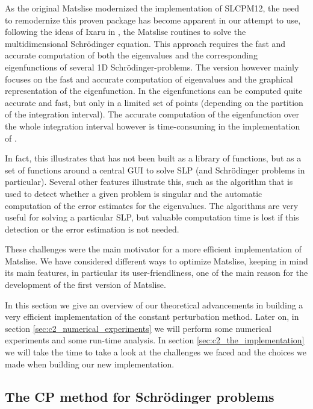 As the original Matslise modernized the implementation of SLCPM12, the need to remodernize this proven package has become apparent in our attempt to use, following the ideas of Ixaru in \cite{ixaru_new_2010}, the Matslise routines to solve the multidimensional Schrödinger equation. This approach requires the fast and accurate computation of both the eigenvalues and the corresponding eigenfunctions of several 1D Schrödinger-problems. The  version however mainly focuses on the fast and accurate computation of eigenvalues and the graphical representation of the eigenfunction. In  the eigenfunctions can be computed quite accurate and fast, but only in a limited set of points (depending on the partition of the integration interval). The accurate computation of the eigenfunction over the whole integration interval however is time-consuming in the implementation of .

In fact, this illustrates that  has not been built as a library of functions, but as a set of functions around a central GUI to solve SLP (and Schrödinger problems in particular). Several other features illustrate this, such as the algorithm that is used to detect whether a given problem is singular and the automatic computation of the error estimates for the eigenvalues. The algorithms are very useful for solving a particular SLP, but valuable computation time is lost if this detection or the error estimation is not needed.

These challenges were the main motivator for a more efficient implementation of Matslise. We have considered different ways to optimize Matslise, keeping in mind its main features, in particular its user-friendliness, one of the main reason for the development of the first version of Matslise.

In this section we give an overview of our theoretical advancements \cite{baeyens_fast_2020} in building a very efficient implementation of the constant perturbation method. Later on, in section \ref{sec:c2_numerical_experiments} we will perform some numerical experiments and some run-time analysis. In section \ref{sec:c2_the_implementation} we will take the time to take a look at the challenges we faced and the choices we made when building our new implementation.

\subsection{The CP method for Schrödinger problems}\label{the-method}

